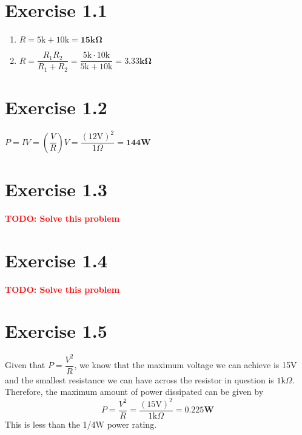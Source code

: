 \documentclass{article}
\newcommand{\todo}[1]{\textcolor{red}{\textbf{TODO: #1}}}
\newcommand{\ex}[1]{\section*{Exercise #1}}
\newcommand{\mans}[1]{\boxed{\mathbf{#1}}}
\renewcommand{\k}{\ensuremath{\text{k}}} %
\newcommand{\V}{\ensuremath{\text{V}}}
\newcommand{\Ohm}{\ensuremath{\Omega}}
\newcommand{\W}{\ensuremath{\text{W}}}
\begin{document}
    \ex{1.1}
    \begin{enumerate}
        \item 
        $R = 5\k + 10\k = \mans{15\k\Omega}$

        \item 
        $R = \dfrac{R_1 R_2}{R_1 + R_2} = \dfrac{5\k \cdot 10\k}{5\k + 10\k} = \mans{3.33\k\Omega}$

    \end{enumerate}

    \ex{1.2}
    $P = IV = \left(\dfrac{V}{R}\right)V = \dfrac{(12\V)^2}{1\Ohm} = \mans{144\W}$

    \ex{1.3}
    \todo{Solve this problem}

    \ex{1.4}
    \todo{Solve this problem}

    \ex{1.5}
    Given that $P = \dfrac{V^2}{R}$, we know that the maximum voltage we can achieve is 15V and the smallest resistance we can have across the resistor in question is $1\k\Ohm$. Therefore, the maximum amount of power dissipated can be given by \[P = \frac{V^2}{R} = \frac{(15\V)^2}{1\k\Ohm} = \mans{0.225\W}\]
    This is less than the 1/4W power rating.
\end{document}
